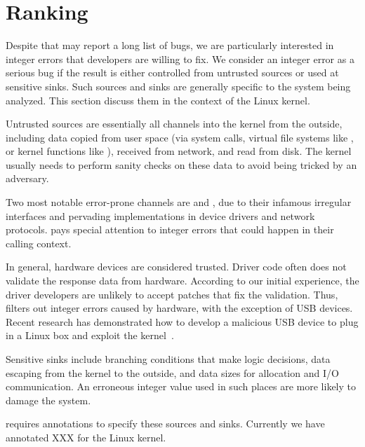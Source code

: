 \section{Ranking}
\label{s:rank}

Despite that \sys may report a long list of bugs, we are particularly
interested in integer errors that developers are willing to fix.
We consider an integer error as a serious bug if the result is
either controlled from untrusted sources or used at sensitive sinks.
Such sources and sinks are generally specific to the system being
analyzed.  This section discuss them in the context of the Linux
kernel.

Untrusted sources are essentially all channels into the kernel from
the outside, including data copied from user space (via system
calls, virtual file systems like , or kernel functions
like ), received from network, and read from
disk.
The kernel usually needs to perform sanity checks on these data to
avoid being tricked by an adversary.

Two most notable error-prone channels are  and ,
due to their infamous irregular interfaces and pervading implementations
in device drivers and network protocols.  \sys pays special attention
to integer errors that could happen in their calling context.

In general, hardware devices are considered trusted.  Driver code
often does not validate the response data from hardware.  According
to our initial experience, the driver developers are unlikely to
accept patches that fix the validation.  Thus, \sys filters out
integer errors caused by hardware,
%
with the exception of USB devices.  Recent research has demonstrated
how to develop a malicious USB device to plug in a Linux box and
exploit the kernel~\cite{usb:buffer-overflow}.

Sensitive sinks include branching conditions that make logic
decisions, data escaping from the kernel to the outside, and data
sizes for allocation and I/O communication.  An erroneous integer
value used in such places are more likely to damage the system.

\sys requires annotations to specify these sources and sinks.
Currently we have annotated XXX for the Linux kernel.
